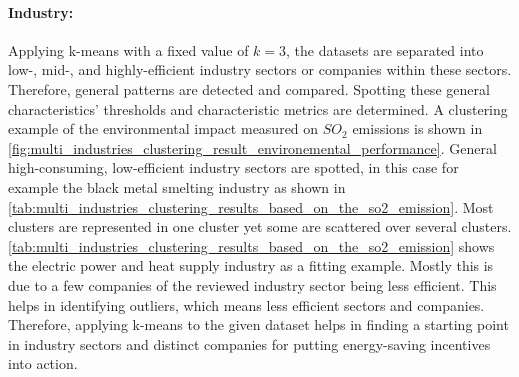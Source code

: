 \paragraph*{Industry:}
Applying k-means with a fixed value of $k=3$, the datasets are separated into low-, mid-, and highly-efficient industry sectors or companies within these sectors.
Therefore, general patterns are detected and compared.
Spotting these general characteristics' thresholds and characteristic metrics are determined.
A clustering example of the environmental impact measured on $SO_2$ emissions is shown in \autoref{fig:multi_industries_clustering_result_environemental_performance}.
General high-consuming, low-efficient industry sectors are spotted, in this case for example the black metal smelting industry as shown in \autoref{tab:multi_industries_clustering_results_based_on_the_so2_emission}.
Most clusters are represented in one cluster yet some are scattered over several clusters.
\autoref{tab:multi_industries_clustering_results_based_on_the_so2_emission} shows the electric power and heat supply industry as a fitting example.
Mostly this is due to a few companies of the reviewed industry sector being less efficient.
This helps in identifying outliers, which means less efficient sectors and companies.
Therefore, applying k-means to the given dataset helps in finding a starting point in industry sectors and distinct companies for putting energy-saving incentives into action.

